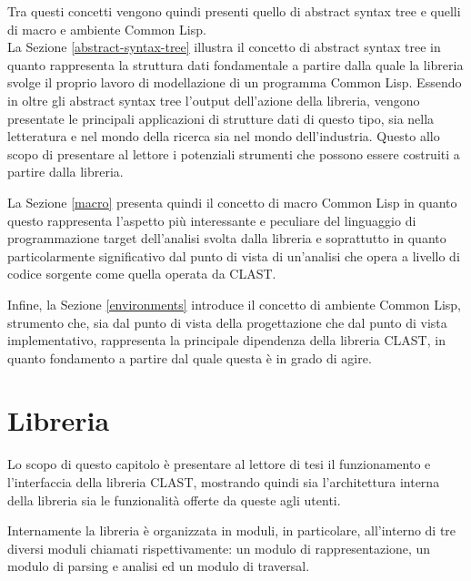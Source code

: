 \documentclass{book}
\begin{document}
Tra questi concetti vengono quindi presenti quello di abstract syntax tree e
quelli di macro e ambiente Common Lisp.\\

La Sezione \ref{abstract-syntax-tree} illustra il concetto di abstract syntax
tree in quanto rappresenta la struttura dati fondamentale a partire dalla quale
la libreria svolge il proprio lavoro di modellazione di un programma Common
Lisp. Essendo in oltre gli abstract syntax tree l'output dell'azione della
libreria, vengono presentate le principali applicazioni di strutture dati di
questo tipo, sia nella letteratura e nel mondo della ricerca sia nel mondo
dell'industria. Questo allo scopo di presentare al lettore i potenziali
strumenti che possono essere costruiti a partire dalla libreria.

La Sezione \ref{macro} presenta quindi il concetto di macro Common Lisp in
quanto questo rappresenta l'aspetto più interessante e peculiare del linguaggio
di programmazione target dell'analisi svolta dalla libreria e soprattutto in
quanto particolarmente significativo dal punto di vista di un'analisi che opera
a livello di codice sorgente come quella operata da CLAST.

Infine, la Sezione \ref{environments} introduce il concetto di ambiente Common
Lisp, strumento che, sia dal punto di vista della progettazione che dal punto di
vista implementativo, rappresenta la principale dipendenza della libreria CLAST,
in quanto fondamento a partire dal quale questa è in grado di agire.






\endgroup

\begingroup
\let\clearpage\relax

\chapter{Libreria}
\label{library}

Lo scopo di questo capitolo è presentare al lettore di tesi il funzionamento e
l'interfaccia della libreria CLAST, mostrando quindi sia l'architettura interna
della libreria sia le funzionalità offerte da queste agli utenti.

Internamente la libreria è organizzata in moduli, in particolare, all'interno di
tre diversi moduli chiamati rispettivamente: un modulo di rappresentazione, un
modulo di parsing e analisi ed un modulo di traversal.\\
\end{document}
